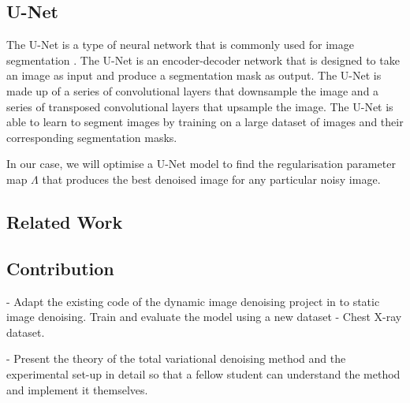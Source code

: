 \documentclass[12pt]{article}
\begin{document}



\subsection{U-Net}

The U-Net is a type of neural network that is commonly used for image segmentation \cite{ronneberger2015unet}.
The U-Net is an encoder-decoder network that is designed to take an image as input and produce a segmentation mask as output.
The U-Net is made up of a series of convolutional layers that downsample the image and a series of transposed convolutional layers that upsample the image.
The U-Net is able to learn to segment images by training on a large dataset of images and their corresponding segmentation masks.


In our case, we will optimise a U-Net model to find the regularisation parameter map 
$\Lambda$ 
that produces the best denoised image for any particular noisy image.


\subsection{Related Work}


\subsection{Contribution}

- Adapt the existing code of the dynamic image denoising project in \cite{kofler2023learning} to static image denoising. Train and evaluate the model using a new dataset - Chest X-ray dataset.

- Present the theory of the total variational denoising method and the experimental set-up in detail so that a fellow student can understand the method and implement it themselves.



\end{document}
